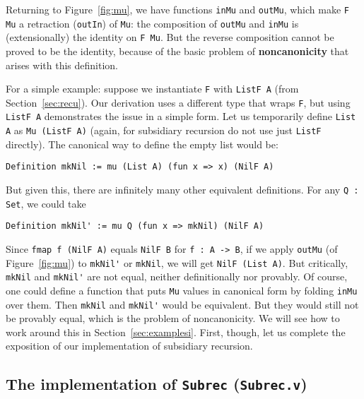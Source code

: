 \documentclass[a4paper,USenglish]{lipics-v2021}
\begin{document}
Returning to Figure~\ref{fig:mu}, we have functions \verb|inMu| and
\verb|outMu|, which make \verb|F Mu| a retraction (\verb|outIn|) of
\verb|Mu|: the composition of \verb|outMu| and \verb|inMu| is
(extensionally) the identity on \verb|F Mu|.  But the reverse
composition cannot be proved to be the identity, because of the basic
problem of \textbf{noncanonicity} that arises with this definition.

For a simple example: suppose we instantiate \verb|F| with
\verb|ListF A| (from Section~\ref{sec:recu}).  Our derivation uses a
different type that wraps \verb|F|, but using \verb|ListF A|
demonstrates the issue in a simple form.  Let us temporarily define
\verb|List A| as \verb|Mu (ListF A)| (again, for subsidiary recursion
do not use just \verb|ListF| directly).  The canonical way to define
the empty list would be:
\begin{verbatim}
Definition mkNil := mu (List A) (fun x => x) (NilF A)
\end{verbatim}
\noindent But given this, there are infinitely many other equivalent
definitions.  For any \verb|Q : Set|, we could take
\begin{verbatim}
Definition mkNil' := mu Q (fun x => mkNil) (NilF A)
\end{verbatim}
\noindent Since \verb|fmap f (NilF A)| equals \verb|NilF B| for
\verb|f : A -> B|, if we apply \verb|outMu| (of Figure~\ref{fig:mu})
to \verb|mkNil'| or \verb|mkNil|, we will get \verb|NilF (List A)|.
But critically, \verb|mkNil| and \verb|mkNil'| are not equal, neither
definitionally nor provably.  Of course, one could define a function
that puts \verb|Mu| values in canonical form by folding \verb|inMu|
over them.  Then \verb|mkNil| and \verb|mkNil'| would be equivalent.
But they would still not be provably equal, which is the problem of
noncanonicity.  We will see how to work around this in
Section~\ref{sec:examplesi}.  First, though, let us complete the
exposition of our implementation of subsidiary recursion.

\subsection{The implementation of \texttt{Subrec} (\texttt{Subrec.v})}
\label{sec:subrecimpl}
\end{document}
